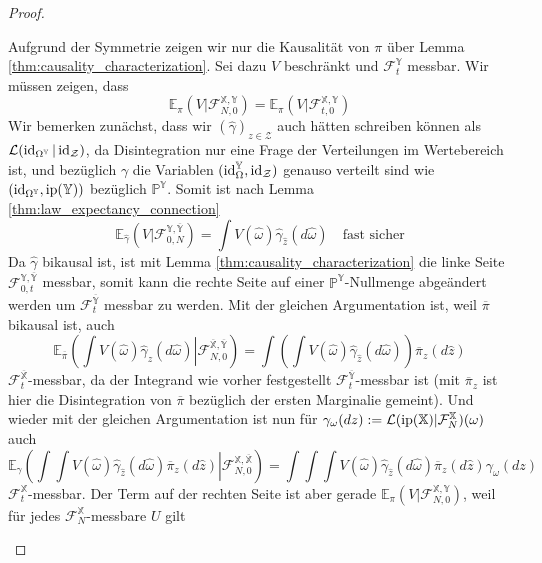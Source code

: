 \begin{proof}
\begin{enumerate}
Aufgrund der Symmetrie zeigen wir nur die Kausalität von $\pi$ über Lemma \ref{thm:causality_characterization}. Sei dazu $V$ beschränkt und $\mathcal{F}_{t}^{\mathbb{Y}}$ messbar. Wir müssen zeigen, dass 
$$\mathbb{E}_\pi(V \vert \mathcal{F}_{N, 0}^{\mathbb{X}, \mathbb{Y}}) = \mathbb{E}_\pi(V \vert \mathcal{F}_{t, 0}^{\mathbb{X}, \mathbb{Y}})$$
Wir bemerken zunächst, dass wir $(\hat{\gamma})_{z\in\mathcal{Z}}$ auch hätten schreiben können als $\mathcal{L}(\operatorname{id}_{\Omega^\mathbb{Y}} \vert \operatorname{id}_{\mathcal{Z}})$, da Disintegration nur eine Frage der Verteilungen im Wertebereich ist, und bezüglich $\gamma$ die Variablen $(\operatorname{id}_\Omega^\mathbb{Y}, \operatorname{id}_{\mathcal{Z}})$ genauso verteilt sind wie $(\operatorname{id}_{\Omega^\mathbb{Y}}, \operatorname{ip}(\mathbb{Y}))$ bezüglich $\mathbb{P}^\mathbb{Y}$. Somit ist nach Lemma \ref{thm:law_expectancy_connection}
$$\mathbb{E}_{\hat{\gamma}}(V \vert \mathcal{F}_{0,N}^{\mathbb{Y}, \overline{\mathbb{Y}}}) = \int V(\hat{\omega})\hat{\gamma}_{\hat{z}}(d\hat{\omega}) \quad \text{fast sicher}$$
Da $\hat{\gamma}$ bikausal ist, ist mit Lemma \ref{thm:causality_characterization} die linke Seite $\mathcal{F}_{0,t}^{\mathbb{Y}, \overline{\mathbb{Y}}}$ messbar, somit kann die rechte Seite auf einer $\mathbb{P}^\mathbb{Y}$-Nullmenge abgeändert werden um $\mathcal{F}_t^{\overline{\mathbb{Y}}}$ messbar zu werden. Mit der gleichen Argumentation ist, weil $\overline{\pi}$ bikausal ist, auch
$$\mathbb{E}_{\overline{\pi}}\left(\int V(\hat{\omega})\hat{\gamma}_{\hat{z}}(d\hat{\omega}) \left\vert \mathcal{F}_{N,0}^{\overline{\mathbb{X}}, \overline{\mathbb{Y}}}\right.\right)=\int\left(\int V(\hat{\omega})\hat{\gamma}_{\hat{z}}(d\hat{\omega})\right)\overline{\pi}_z(d\hat{z})$$
$\mathcal{F}_t^{\overline{\mathbb{X}}}$-messbar, da der Integrand wie vorher festgestellt $\mathcal{F}_t^{\overline{\mathbb{Y}}}$-messbar ist (mit $\overline{\pi}_z$ ist hier die Disintegration von $\overline{\pi}$ bezüglich der ersten Marginalie gemeint). Und wieder mit der gleichen Argumentation ist nun für $\gamma_\omega(dz):=\mathcal{L}(\operatorname{ip}(\mathbb{X}) \vert \mathcal{F}_N^{\mathbb{X}})(\omega)$ auch
$$\mathbb{E}_{\gamma}\left( \int \int V(\hat{\omega}) \hat{\gamma}_{\hat{z}}(d\hat{\omega}) \overline{\pi}_z(d\hat{z}) \left\vert \mathcal{F}_{N,0}^{\mathbb{X}, \overline{\mathbb{X}}} \right. \right) = \int\int\int V(\hat{\omega}) \hat{\gamma}_{\hat{z}}(d\hat{\omega}) \overline{\pi}_z(d\hat{z})\gamma_\omega(dz)$$
$\mathcal{F}_t^{\mathbb{X}}$-messbar. Der Term auf der rechten Seite ist aber gerade $\mathbb{E}_\pi(V \vert \mathcal{F}_{N,0}^{\mathbb{X}, \mathbb{Y}})$, weil für jedes $\mathcal{F}_{N}^{\mathbb{X}}$-messbare $U$ gilt

\end{enumerate}
\end{proof}
